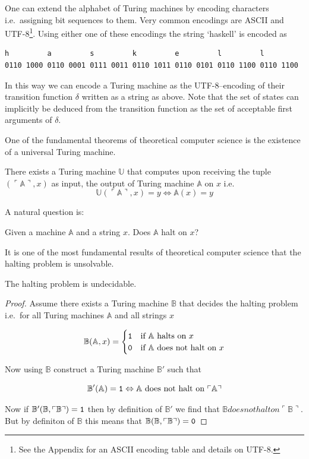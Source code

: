 One can extend the alphabet of Turing machines by encoding characters
i.e.~assigning bit sequences to them. Very common encodings are
\textsc{ASCII} and \textsc{UTF-8}\footnote{See the Appendix for an
  \textsc{ASCII} encoding table and details on \textsc{UTF-8}.}. Using
either one of these encodings the string `haskell' is encoded as

\begin{lstlisting}
h         a         s         k         e         l         l
0110 1000 0110 0001 0111 0011 0110 1011 0110 0101 0110 1100 0110 1100
\end{lstlisting}

In this way we can encode a Turing machine as the \textsc{UTF-8}--encoding of
their transition function $δ$ written as a string as above. Note that
the set of states can implicitly be deduced from the transition function
as the set of acceptable first arguments of $δ$.

One of the fundamental theorems of theoretical computer science is the
existence of a universal Turing machine.

\begin{thm}
    There exists a Turing machine $\mathbb U$ that computes upon receiving
    the tuple $(\ulcorner \mathbb A \urcorner, x)$ as input, the output of
    Turing machine $\mathbb A$ on $x$ i.e.
    \[ \mathbb U(\ulcorner \mathbb A \urcorner, x) = y \Leftrightarrow \mathbb A (x) = y\]
\end{thm}

A natural question is:

Given a machine $\mathbb A$ and a string $x$. Does $\mathbb A$
halt on $x$?

It is one of the most fundamental results of theoretical computer
science that the halting problem is unsolvable.

\begin{thm}
    The halting problem is undecidable.
\end{thm}
\begin{proof}
    Assume there exists a Turing machine $\mathbb B$ that decides the
    halting problem i.e.~for all Turing machines $\mathbb A$ and all
    strings $x$
    
    \[ \mathbb B(\mathbb A, x) =
    \begin{cases}
      \mathtt 1  & \text{if } \mathbb A \text{ halts on } x\\
      \mathtt 0  & \text{if } \mathbb A \text{ does not halt on } x
    \end{cases}\]
    
    Now using $\mathbb B$ construct a Turing machine $\mathbb B'$ such
    that
    
    \[ \mathbb B'(\mathbb A) = \mathtt 1 \Leftrightarrow \mathbb A \text{ does not halt on } \ulcorner \mathbb A\urcorner \]
    
    Now if $\mathbb B'(\mathbb B, \ulcorner \mathbb B\urcorner) = \mathtt 1$
    then by definition of $\mathbb B'$ we find that
    $\mathbb B does not halt on \ulcorner \mathbb B\urcorner$. But by
    definiton of $\mathbb B$ this means that
    $\mathbb B(\mathbb B, \ulcorner \mathbb B \urcorner) = \mathtt 0$
\end{proof}
